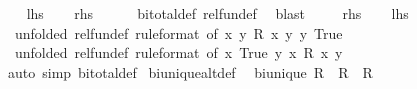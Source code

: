 \begin{isabellebody}
\isadelimproof
%
\endisadelimproof
%
\isatagproof
{}\isamarkupfalse%
\isanewline
\ \ \isamarkupfalse%
\ {\isacharquery}{\kern0pt}lhs\ \isamarkupfalse%
\ \isamarkupfalse%
\ {\isacharquery}{\kern0pt}rhs\isanewline
\ \ \ \ \isamarkupfalse%
\ bi{\isacharunderscore}{\kern0pt}total{\isacharunderscore}{\kern0pt}def\ rel{\isacharunderscore}{\kern0pt}fun{\isacharunderscore}{\kern0pt}def\ \isamarkupfalse%
\ blast\isanewline
{}\isamarkupfalse%
\isanewline
\ \ \isamarkupfalse%
\ {\isasymsection}{\isacharcolon}{\kern0pt}\ {\isacharquery}{\kern0pt}rhs\isanewline
\ \ \isamarkupfalse%
\ {\isacharquery}{\kern0pt}lhs\isanewline
\ \ \ \ \isamarkupfalse%
\ {\isasymsection}\ {\isacharbrackleft}{\kern0pt}unfolded\ rel{\isacharunderscore}{\kern0pt}fun{\isacharunderscore}{\kern0pt}def{\isacharcomma}{\kern0pt}\ rule{\isacharunderscore}{\kern0pt}format{\isacharcomma}{\kern0pt}\ of\ {\isachardoublequoteopen}{\isasymlambda}x{\isachardot}{\kern0pt}\ {\isasymexists}y{\isachardot}{\kern0pt}\ R\ x\ y{\isachardoublequoteclose}\ {\isachardoublequoteopen}{\isasymlambda}y{\isachardot}{\kern0pt}\ True{\isachardoublequoteclose}{\isacharbrackright}{\kern0pt}\isanewline
\ \ \ \ \isamarkupfalse%
\ {\isasymsection}\ {\isacharbrackleft}{\kern0pt}unfolded\ rel{\isacharunderscore}{\kern0pt}fun{\isacharunderscore}{\kern0pt}def{\isacharcomma}{\kern0pt}\ rule{\isacharunderscore}{\kern0pt}format{\isacharcomma}{\kern0pt}\ of\ {\isachardoublequoteopen}{\isasymlambda}x{\isachardot}{\kern0pt}\ True{\isachardoublequoteclose}\ {\isachardoublequoteopen}{\isasymlambda}y{\isachardot}{\kern0pt}\ {\isasymexists}x{\isachardot}{\kern0pt}\ R\ x\ y{\isachardoublequoteclose}{\isacharbrackright}{\kern0pt}\isanewline
\ \ \ \ \isamarkupfalse%
\ {\isacharparenleft}{\kern0pt}auto\ simp{\isacharcolon}{\kern0pt}\ bi{\isacharunderscore}{\kern0pt}total{\isacharunderscore}{\kern0pt}def{\isacharparenright}{\kern0pt}\isanewline
{}\isamarkupfalse%
%
\endisatagproof
{\isafoldproof}%
%
\isadelimproof
\isanewline
%
\endisadelimproof
\isanewline
{}\isamarkupfalse%
\ bi{\isacharunderscore}{\kern0pt}unique{\isacharunderscore}{\kern0pt}alt{\isacharunderscore}{\kern0pt}def{}{\isacharcolon}{\kern0pt}\isanewline
\ \ {\isachardoublequoteopen}bi{\isacharunderscore}{\kern0pt}unique\ R\ {\isasymlongleftrightarrow}\ {\isacharparenleft}{\kern0pt}R\ {\isacharequal}{\kern0pt}{\isacharequal}{\kern0pt}{\isacharequal}{\kern0pt}{\isachargreater}{\kern0pt}\ R\ {\isacharequal}{\kern0pt}{\isacharequal}{\kern0pt}{\isacharequal}{\kern0pt}{\isachargreater}{\kern0pt}\ {\isacharparenleft}{\kern0pt}{\isacharequal}{\kern0pt}{\isacharparenright}{\kern0pt}{\isacharparenright}{\kern0pt}\ {\isacharparenleft}{\kern0pt}{\isacharequal}{\kern0pt}{\isacharparenright}{\kern0pt}\ {\isacharparenleft}{\kern0pt}{\isacharequal}{\kern0pt}{\isacharparenright}{\kern0pt}{\isachardoublequoteclose}\isanewline

\end{isabellebody}
